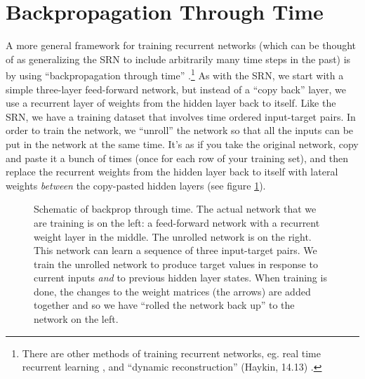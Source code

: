 \section{Backpropagation Through Time}




A more general framework for training recurrent networks (which can be thought of as generalizing the SRN to include arbitrarily many time steps in the past) is by using ``backpropagation through time'' \cite{werbos1990bptt}.\footnote{There are other methods of training recurrent networks, eg. real time recurrent learning \cite{williams1989learning}, and ``dynamic reconstruction'' (Haykin, 14.13) \cite{haykin1998neural}.} As with the SRN, we start with a simple three-layer feed-forward network, but instead of a ``copy back''  layer, we use a recurrent layer of weights from the hidden layer back to itself. Like the SRN, we have a training dataset that involves time ordered input-target pairs. In order to train the network, we ``unroll'' the network so that all the inputs can be put in the network at the same time. It's as if you take the original network, copy and paste it a bunch of times (once for each row of your training set), and then replace the recurrent weights from the hidden layer back to itself with lateral weights \emph{between} the copy-pasted hidden layers (see figure \ref{bptt}). 

\begin{figure}[h]
\centering
{}
\caption[Jeff Yoshimi.]{Schematic of backprop through time. The actual network that we are training is on the left: a feed-forward network with a recurrent weight layer in the middle. The unrolled network is on the right. This network can learn a sequence of three input-target pairs. We train the unrolled network to produce target values in response to current inputs \emph{and} to previous hidden layer states. When training is done, the changes to the weight matrices (the arrows) are added together and so we have ``rolled the network back up'' to the network on the left.}
\label{bptt}
\end{figure}

